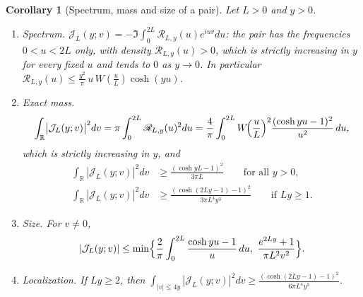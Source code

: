 \documentclass[11pt,a4paper]{article}
\numberwithin{equation}{section}
\newtheorem{corollary}[theorem]{Corollary}
\theoremstyle{definition}
\theoremstyle{remark}
\begin{document}
\begin{corollary}[Spectrum, mass and size of a pair]\label{cor:taucw-pair}
Let $L>0$ and $y>0$.
\begin{enumerate}[label=(\alph*),leftmargin=*]
\item \emph{Spectrum.} $\mathcal J_L(y;v)=-\Im\int_0^{2L}\mathscr R_{L,y}(u)e^{iuv}du$: the pair has the frequencies $0<u<2L$ only, with density $\mathscr R_{L,y}(u)>0$, which is strictly increasing in $y$ for every fixed $u$ and tends to $0$ as $y\to0$. In particular $\mathscr R_{L,y}(u)\le\frac{y^2}{\pi}\,u\,W(\tfrac uL)\cosh(yu)$.
\item \emph{Exact mass.}
\begin{equation}\label{eq:taucw-mass}
\int_{\mathbb R}\bigl|\mathcal J_L(y;v)\bigr|^2dv=\pi\int_0^{2L}\mathscr R_{L,y}(u)^2du=\frac4\pi\int_0^{2L}W\!\Bigl(\frac uL\Bigr)^2\frac{(\cosh yu-1)^2}{u^2}\,du,
\end{equation}
which is strictly increasing in $y$, and
\begin{align}
\int_{\mathbb R}|\mathcal J_L(y;v)|^2dv&\ge\frac{(\cosh yL-1)^2}{3\pi L}\qquad\text{for all }y>0,\label{eq:taucw-mass-lb}\\
\int_{\mathbb R}|\mathcal J_L(y;v)|^2dv&\ge\frac{(\cosh(2Ly-1)-1)^2}{3\pi L^4y^3}\qquad\text{if }Ly\ge1 .\label{eq:taucw-mass-lb2}
\end{align}
\item \emph{Size.} For $v\ne0$,
\begin{equation}\label{eq:taucw-pair-size}
|\mathcal J_L(y;v)|\le\min\Bigl\{\frac2\pi\int_0^{2L}\frac{\cosh yu-1}{u}\,du,\ \frac{e^{2Ly}+1}{\pi L^2v^2}\Bigr\}.
\end{equation}
\item \emph{Localization.} If $Ly\ge2$, then $\displaystyle\int_{|v|\le4y}|\mathcal J_L(y;v)|^2dv\ge\frac{(\cosh(2Ly-1)-1)^2}{6\pi L^4y^3}$.
\end{enumerate}
\end{corollary}
\end{document}
